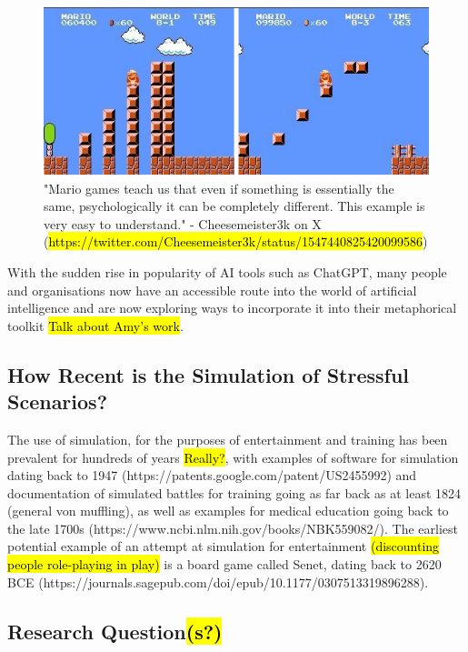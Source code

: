 \documentclass{article}
\begin{document}
\begin{figure}[ht]
    \centering
    \begin{minipage}[b]{0.9\linewidth}
      \includegraphics[width=\linewidth]{Images/cheeseMeister3kMario.png}
      \caption{"Mario games teach us that even if something is essentially the same, psychologically it can be completely different. This example is very easy to understand." - Cheesemeister3k on X (\hl{https://twitter.com/Cheesemeister3k/status/1547440825420099586})}
      \label{fig:image1}
    \end{minipage}
  \end{figure}

With the sudden rise in popularity of AI tools such as ChatGPT, many people and organisations now have an accessible route into the world of artificial intelligence and are now exploring ways to incorporate it into their metaphorical toolkit \hl{Talk about Amy's work}. 

\subsection{How Recent is the Simulation of Stressful Scenarios?}

The use of simulation, for the purposes of entertainment and training has been prevalent for hundreds of years \hl{Really?}, with examples of software for simulation dating back to 1947 (https://patents.google.com/patent/US2455992) and documentation of simulated battles for training going as far back as at least 1824 (general von muffling), as well as examples for medical education going back to the late 1700s (https://www.ncbi.nlm.nih.gov/books/NBK559082/). The earliest potential example of an attempt at simulation for entertainment \hl{(discounting people role-playing in play)} is a board game called Senet, dating back to 2620 BCE (https://journals.sagepub.com/doi/epub/10.1177/0307513319896288).

  
  \subsection{Research Question\hl{(s?)}}
  
\end{document}
